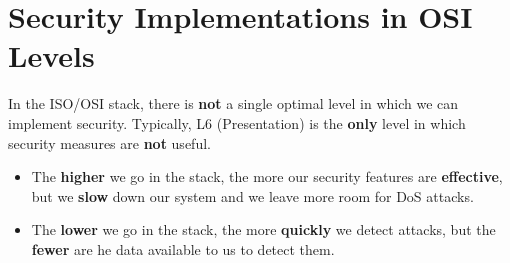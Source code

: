 \chapter{Security Implementations in OSI Levels}
\begin{quotebox-yellow}{}
    In the ISO/OSI stack, there is \textbf{not} a single optimal level in which we can implement security. Typically, L6 (Presentation) is the \textbf{only} level in which security measures are \textbf{not} useful.
\begin{itemize}
    \item The \textbf{higher} we go in the stack, the more our security features are \textbf{effective}, but we \textbf{slow}
    down our system and we leave more room for DoS attacks.
    \item The \textbf{lower} we go in the stack, the more \textbf{quickly} we detect attacks, but the \textbf{fewer} are he data available to us to detect them.
\end{itemize}
\end{quotebox-yellow}
